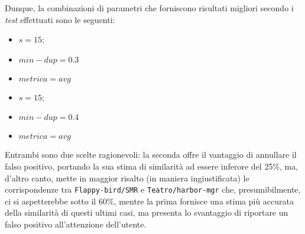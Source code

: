 Dunque, la combinazioni di parametri che forniscono risultati migliori secondo i \textit{test} effettuati sono le seguenti:

\begin{multicols}{2}
    \begin{itemize}
        \item $s = 15$;
        \item $min-dup=0.3$
        \item $metrica=avg$
    \end{itemize}
    
    \begin{itemize}
        \item $s = 15$;
        \item $min-dup=0.4$
        \item $metrica=avg$
    \end{itemize}
\end{multicols}

Entrambi sono due scelte ragionevoli: la seconda offre il vantaggio di annullare il falso positivo, portando la sua stima di similarità ad essere inferore del 25\%, ma, d'altro canto, mette in maggior risalto (in maniera ingiustificata) le corrispondenze tra \texttt{Flappy-bird/SMR} e \texttt{Teatro/harbor-mgr} che, presumibilmente, ci si aspetterebbe sotto il 60\%, mentre la prima fornisce una stima più accurata della similarità di questi ultimi casi, ma presenta lo svantaggio di riportare un falso positivo all'attenzione dell'utente.


